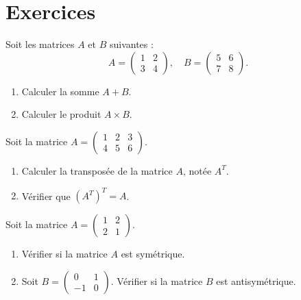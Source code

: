 \section{Exercices}
\begin{exercice}
Soit les matrices \( A \) et \( B \) suivantes :
\[
A = \begin{pmatrix} 1 & 2 \\ 3 & 4 \end{pmatrix}, \quad B = \begin{pmatrix} 5 & 6 \\ 7 & 8 \end{pmatrix}.
\]
\begin{enumerate}
    \item Calculer la somme \( A + B \).
    \item Calculer le produit \( A \times B \).
\end{enumerate}
\end{exercice}

\begin{exercice}
Soit la matrice \( A = \begin{pmatrix} 1 & 2 & 3 \\ 4 & 5 & 6 \end{pmatrix} \).
\begin{enumerate}
    \item Calculer la transposée de la matrice \( A \), notée \( A^T \).
    \item Vérifier que \( (A^T)^T = A \).
\end{enumerate}
\end{exercice}

\begin{exercice}
Soit la matrice \( A = \begin{pmatrix} 1 & 2 \\ 2 & 1 \end{pmatrix} \).
\begin{enumerate}
    \item Vérifier si la matrice \( A \) est symétrique.
    \item Soit \( B = \begin{pmatrix} 0 & 1 \\ -1 & 0 \end{pmatrix} \). Vérifier si la matrice \( B \) est antisymétrique.
\end{enumerate}
\end{exercice}

